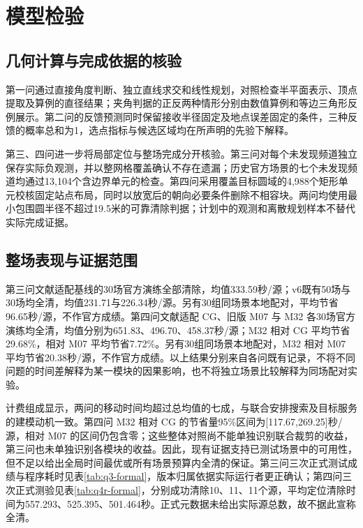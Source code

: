 \documentclass[UTF8,a4paper,zihao=-4,fontset=none]{ctexart}
\begin{document}
\FloatBarrier





\section{模型检验}

\subsection{几何计算与完成依据的核验}

第一问通过直接角度判断、独立直线求交和线性规划，对照检查半平面表示、顶点提取及算例的直径结果；夹角判据的正反两种情形分别由数值算例和等边三角形反例展示。第二问的反馈预测同时保留接收半径固定及地点误差固定的条件，三种反馈的概率总和为1，选点指标与候选区域均在所声明的先验下解释。

第三、四问进一步将局部定位与整场完成分开核验。第三问对每个未发现频道独立保存实际负观测，并以整网格覆盖确认不存在遗漏；历史官方场景的七个未发现频道均通过13,104个含边界单元的检查。第四问采用覆盖目标圆域的4,988个矩形单元校核固定站点布局，同时以放宽后的朝向必要条件删除不相容块。两问均使用最小包围圆半径不超过19.5米的可靠清除判据；计划中的观测和离散规划样本不替代实际完成证据。

\subsection{整场表现与证据范围}

第三问文献适配基线的30场官方演练全部清除，均值333.59秒/源；v6既有50场与30场均全清，均值231.71与226.34秒/源。另有30组同场景本地配对，平均节省96.65秒/源，不作官方成绩。第四问文献适配 CG、旧版 M07 与 M32 各30场官方演练均全清，均值分别为651.83、496.70、458.37秒/源；M32 相对 CG 平均节省29.68\%，相对 M07 平均节省7.72\%。另有30组同场景本地配对，M32 相对 M07 平均节省20.38秒/源，不作官方成绩。以上结果分别来自各问既有记录，不将不同问题的时间差解释为某一模块的因果影响，也不将独立场景比较解释为同场配对实验。

计费组成显示，两问的移动时间均超过总均值的七成，与联合安排搜索及目标服务的建模动机一致。第四问 M32 相对 CG 的节省量95\%区间为[117.67,269.25]秒/源，相对 M07 的区间仍包含零；这些整体对照尚不能单独识别联合裁剪的收益，第三问也未单独识别各模块的收益。因此，现有证据支持已测试场景中的可用性，但不足以给出全局时间最优或所有场景预算内全清的保证。第三问三次正式测试成绩与程序耗时见表\ref{tab:q3-formal}，版本归属依据实际运行者更正确认；第四问三次正式测验见表\ref{tab:q4r-formal}，分别成功清除10、11、11个源，平均定位清除时间为557.293、525.395、501.464秒。正式元数据未给出实际源总数，故不据此宣称全清。
\end{document}
